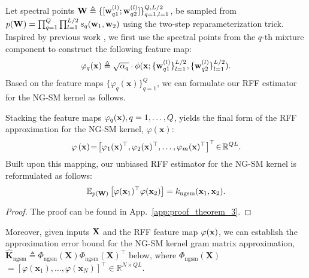 Let spectral points \({\mathbf W} \triangleq \{ [{\mathbf w}_{q1}^{(l)}; {\mathbf w}_{q2}^{(l)}] \}_{q=1, l=1}^{Q, L/2}\), be sampled from \(p({\mathbf W}) = \prod_{q=1}^{Q} \prod_{l=1}^{L / 2} s_q({\mathbf w}_1, {\mathbf w}_2)\) using the two-step reparameterization trick. Inspired by previous work \citep{li2024preventing,jung2022efficient},  we first use the spectral points from the $q$-th mixture component to construct the following feature map:
\begin{equation}
\setlength{\abovedisplayskip}{4.5pt}
\setlength{\belowdisplayskip}{4.5pt}
 \varphi_q(\mathbf{x}) \triangleq \sqrt{\alpha_q} \cdot \phi(\mathbf{x}; \{\mathbf{w}_{q1}^{(l)}\}_{l=1}^{L/2}, \{\mathbf{w}_{q2}^{(l)}\}_{l=1}^{L/2}).
\end{equation}
Based on the feature maps $\{\varphi_q(\mathbf{x})\}_{q=1}^Q$, we can formulate our RFF estimator for the NG-SM kernel as follows.
\begin{theorem}
Stacking the feature maps $\varphi_q({\mathbf x}), q = 1, \ldots, Q$, yields the final form of the RFF approximation for the NG-SM kernel, \(\varphi(\mathbf{x})\):
\begin{equation}
\varphi\left({\mathbf x}\right)\!=\!\left[\varphi_1(\mathbf{x})^{\top}, \varphi_2(\mathbf{x})^{\top}, \ldots, \varphi_m(\mathbf{x})^{\top}\right]^{\top}\!\in\!\mathbb{R}^{Q L}.  
\label{eq:RFF_NGSM}
\end{equation}
Built upon this mapping, our unbiased RFF estimator for the NG-SM kernel is reformulated as follows:
\begin{equation}
\mathbb{E}_{p({\mathbf W})}\left[ \varphi(\mathbf{x}_1)^{\top} \varphi(\mathbf{x}_2)\right] = k_{\mathrm{ngsm}}(\mathbf{x}_1, \mathbf{x}_2).
\end{equation}
\label{prop_NGSM_RFF_approx}
\end{theorem}
\vspace{-0.30in}
\begin{proof}
    The proof can be found in App.~\ref{app:proof_theorem_3}. 
\end{proof}
\vspace{-0.1in}
Moreover, given inputs ${\mathbf X}$ and the RFF feature map $\varphi({\mathbf x})$, we can establish the approximation error bound for the NG-SM kernel gram matrix approximation, \(\hat{\mathbf{K}}_{\mathrm{ngsm}}\!\triangleq\! \Phi_{\mathrm{ngsm}}(\mathbf{X}) \Phi_{\mathrm{ngsm}}(\mathbf{X})^{\top}\) below, where \(\Phi_{\mathrm{ngsm}}(\mathbf{X})\) \(=\left[\varphi\left(\mathbf{x}_1\right), \ldots, \varphi\left(\mathbf{x}_N\right)\right]^{\top} \in \mathbb{R}^{N \times Q L}\).

